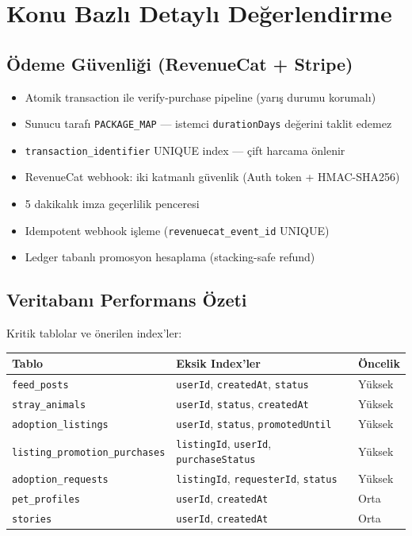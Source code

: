 \documentclass[12pt,a4paper]{article}
\begin{document}
\section{Konu Bazlı Detaylı Değerlendirme}

\subsection*{Ödeme Güvenliği (RevenueCat + Stripe)}

\begin{tcolorbox}[colback=low!8!white, colframe=low, fonttitle=\bfseries, title=İyi Uygulama — Güçlü Yönler]
\begin{itemize}[leftmargin=1em]
  \item Atomik transaction ile verify-purchase pipeline (yarış durumu korumalı)
  \item Sunucu tarafı \texttt{PACKAGE\_MAP} — istemci \texttt{durationDays} değerini taklit edemez
  \item \texttt{transaction\_identifier} UNIQUE index — çift harcama önlenir
  \item RevenueCat webhook: iki katmanlı güvenlik (Auth token + HMAC-SHA256)
  \item 5 dakikalık imza geçerlilik penceresi
  \item Idempotent webhook işleme (\texttt{revenuecat\_event\_id} UNIQUE)
  \item Ledger tabanlı promosyon hesaplama (stacking-safe refund)
\end{itemize}
\end{tcolorbox}

\subsection*{Veritabanı Performans Özeti}

Kritik tablolar ve önerilen index'ler:

\begin{tabularx}{\textwidth}{lXl}
\toprule
\textbf{Tablo} & \textbf{Eksik Index'ler} & \textbf{Öncelik} \\
\midrule
\texttt{feed\_posts} & \texttt{userId}, \texttt{createdAt}, \texttt{status} & Yüksek \\
\texttt{stray\_animals} & \texttt{userId}, \texttt{status}, \texttt{createdAt} & Yüksek \\
\texttt{adoption\_listings} & \texttt{userId}, \texttt{status}, \texttt{promotedUntil} & Yüksek \\
\texttt{listing\_promotion\_purchases} & \texttt{listingId}, \texttt{userId}, \texttt{purchaseStatus} & Yüksek \\
\texttt{adoption\_requests} & \texttt{listingId}, \texttt{requesterId}, \texttt{status} & Yüksek \\
\texttt{pet\_profiles} & \texttt{userId}, \texttt{createdAt} & Orta \\
\texttt{stories} & \texttt{userId}, \texttt{createdAt} & Orta \\
\bottomrule
\end{tabularx}
\end{document}
